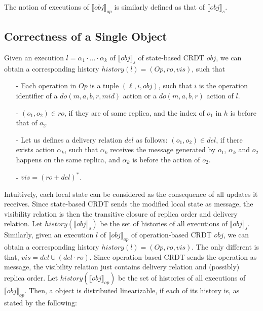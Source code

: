 The notion of executions of $\llbracket \mathit{obj} \rrbracket_{\mathit{op}}$ is similarly defined as that of $\llbracket \mathit{obj} \rrbracket_s$. 



\subsection{Correctness of a Single Object}
\label{subsec:correctness of a single object} 

Given an execution $l = \alpha_1 \cdot \ldots \cdot \alpha_k$ of $\llbracket \mathit{obj} \rrbracket_s$ of state-based CRDT $\mathit{obj}$, we can obtain a corresponding history $\mathit{history}(l) = (\mathit{Op},\mathit{ro},\mathit{vis})$, such that

\begin{itemize}
\setlength{\itemsep}{0.5pt}
\item[-] Each operation in $\mathit{Op}$ is a tuple $(\ell,i,\mathit{obj})$, such that $i$ is the operation identifier of a $\mathit{do}(m,a,b,r,\mathit{mid})$ action or a $\mathit{do}(m,a,b,r)$ action of $l$. 

\item[-] $(o_1,o_2) \in \mathit{ro}$, if they are of same replica, and the index of $o_1$ in $h$ is before that of $o_2$. 

\item[-] Let us defines a delivery relation $\mathit{del}$ as follows: $(o_1,o_2) \in \mathit{del}$, if there exists action $\alpha_k$, such that $\alpha_k$ receives the message generated by $o_1$, $\alpha_k$ and $o_2$ happens on the same replica, and $\alpha_k$ is before the action of $o_2$. 

\item[-] $\mathit{vis} = (\mathit{ro}+\mathit{del})^*$. 
\end{itemize} 

Intuitively, each local state can be considered as the consequence of all updates it receives. Since state-based CRDT sends the modified local state as message, the visibility relation is then the transitive closure of replica order and delivery relation. Let $\mathit{history}(\llbracket \mathit{obj} \rrbracket_s)$ be the set of histories of all executions of $\llbracket \mathit{obj} \rrbracket_s$. Similarly, given an execution $l$ of $\llbracket \mathit{obj} \rrbracket_{\mathit{op}}$ of operation-based CRDT $\mathit{obj}$, we can obtain a corresponding history $\mathit{history}(l) = (\mathit{Op},\mathit{ro},\mathit{vis})$. The only different is that, $\mathit{vis} = \mathit{del} \cup (\mathit{del} \cdot \mathit{ro})$. Since operation-based CRDT sends the operation as message, the visibility relation just contains delivery relation and (possibly) replica order. Let $\mathit{history}(\llbracket \mathit{obj} \rrbracket_{\mathit{op}})$ be the set of histories of all executions of $\llbracket \mathit{obj} \rrbracket_{\mathit{op}}$. Then, a object is distributed linearizable, if each of its history is, as stated by the following: 

